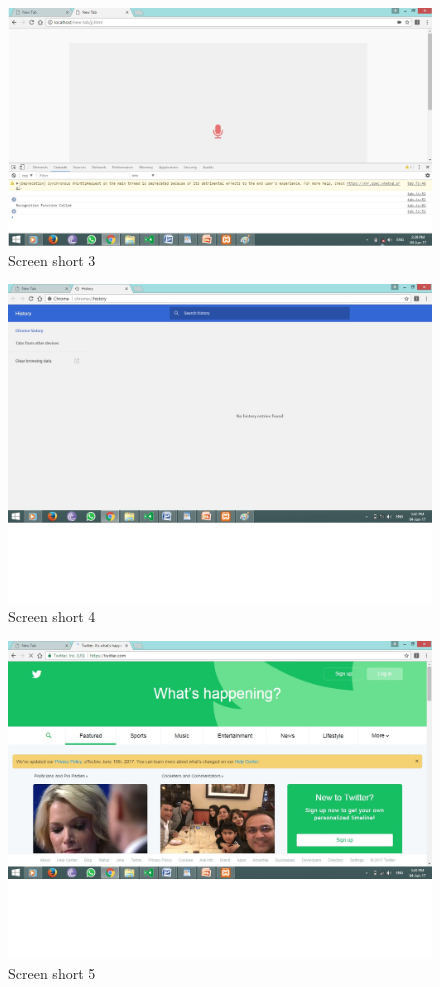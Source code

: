 \documentclass[12pt]{report} %
\begin{document}
\begin{figure}[h]
	\centering
	\includegraphics[width=\linewidth]{figures/screen3.jpg}
	\caption{Screen short 3}
	\label{fig:Screen short 3}
\end{figure}

\begin{figure}[h]
	\centering
	\includegraphics[width=\linewidth]{figures/screen4.jpg}
	\caption{Screen short 4}
	\label{fig:Screen short 4}
\end{figure}

\begin{figure}[h]
	\centering
	\includegraphics[width=\linewidth]{figures/screen5.jpg}
	\caption{Screen short 5}
	\label{fig:Screen short 5}
\end{figure}
\end{document}
